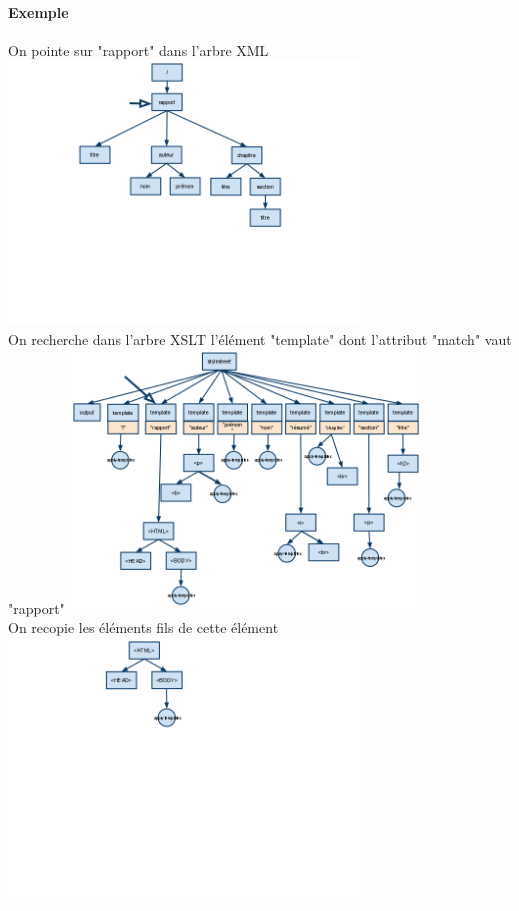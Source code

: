 	\paragraph{Exemple}
	On pointe sur "rapport" dans l'arbre XML
	\includegraphics[width=0.7\textwidth]{img/XMLa}\\
	On recherche dans l'arbre XSLT l'élément "template" dont l'attribut "match" vaut "rapport"
	\includegraphics[width=0.7\textwidth]{img/XSLTa}\\
	On recopie les éléments fils de cette élément 
	\includegraphics[width=0.7\textwidth]{img/HTMLa}\\
